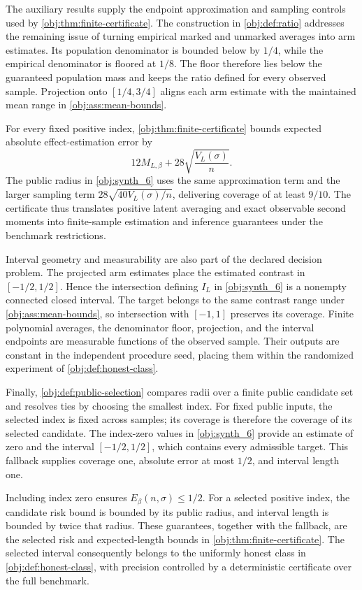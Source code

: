 The auxiliary results supply the endpoint approximation and sampling controls used by \cref{obj:thm:finite-certificate}. The construction in \cref{obj:def:ratio} addresses the remaining issue of turning empirical marked and unmarked averages into arm estimates. Its population denominator is bounded below by \(1/4\), while the empirical denominator is floored at \(1/8\). The floor therefore lies below the guaranteed population mass and keeps the ratio defined for every observed sample. Projection onto \([1/4,3/4]\) aligns each arm estimate with the maintained mean range in \cref{obj:ass:mean-bounds}.

For every fixed positive index, \cref{obj:thm:finite-certificate} bounds expected absolute effect-estimation error by
\[
12M_{L,\beta}+28\sqrt{\frac{V_L(\sigma)}{n}}.
\]
The public radius in \cref{obj:synth_6} uses the same approximation term and the larger sampling term \(28\sqrt{40V_L(\sigma)/n}\), delivering coverage of at least \(9/10\). The certificate thus translates positive latent averaging and exact observable second moments into finite-sample estimation and inference guarantees under the benchmark restrictions.

Interval geometry and measurability are also part of the declared decision problem. The projected arm estimates place the estimated contrast in \([-1/2,1/2]\). Hence the intersection defining \(I_L\) in \cref{obj:synth_6} is a nonempty connected closed interval. The target belongs to the same contrast range under \cref{obj:ass:mean-bounds}, so intersection with \([-1,1]\) preserves its coverage. Finite polynomial averages, the denominator floor, projection, and the interval endpoints are measurable functions of the observed sample. Their outputs are constant in the independent procedure seed, placing them within the randomized experiment of \cref{obj:def:honest-class}.

Finally, \cref{obj:def:public-selection} compares radii over a finite public candidate set and resolves ties by choosing the smallest index. For fixed public inputs, the selected index is fixed across samples; its coverage is therefore the coverage of its selected candidate. The index-zero values in \cref{obj:synth_6} provide an estimate of zero and the interval \([-1/2,1/2]\), which contains every admissible target. This fallback supplies coverage one, absolute error at most \(1/2\), and interval length one.

Including index zero ensures \(E_\beta(n,\sigma)\le1/2\). For a selected positive index, the candidate risk bound is bounded by its public radius, and interval length is bounded by twice that radius. These guarantees, together with the fallback, are the selected risk and expected-length bounds in \cref{obj:thm:finite-certificate}. The selected interval consequently belongs to the uniformly honest class in \cref{obj:def:honest-class}, with precision controlled by a deterministic certificate over the full benchmark.
